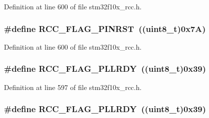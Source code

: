 Definition at line 600 of file stm32f10x\+\_\+rcc.\+h.

\subsubsection[{\texorpdfstring{R\+C\+C\+\_\+\+F\+L\+A\+G\+\_\+\+P\+I\+N\+R\+ST}{RCC_FLAG_PINRST}}]{\setlength{\rightskip}{0pt plus 5cm}\#define R\+C\+C\+\_\+\+F\+L\+A\+G\+\_\+\+P\+I\+N\+R\+ST~(({\bf uint8\+\_\+t})0x7\+A)}\hypertarget{group___r_c_c___flag_gabfc3ab5d4a8a94ec1c9f38794ce37ad6}{}\label{group___r_c_c___flag_gabfc3ab5d4a8a94ec1c9f38794ce37ad6}


Definition at line 600 of file stm32f10x\+\_\+rcc.\+h.

\subsubsection[{\texorpdfstring{R\+C\+C\+\_\+\+F\+L\+A\+G\+\_\+\+P\+L\+L\+R\+DY}{RCC_FLAG_PLLRDY}}]{\setlength{\rightskip}{0pt plus 5cm}\#define R\+C\+C\+\_\+\+F\+L\+A\+G\+\_\+\+P\+L\+L\+R\+DY~(({\bf uint8\+\_\+t})0x39)}\hypertarget{group___r_c_c___flag_gaf82d8afb18d9df75db1d6c08b9c50046}{}\label{group___r_c_c___flag_gaf82d8afb18d9df75db1d6c08b9c50046}


Definition at line 597 of file stm32f10x\+\_\+rcc.\+h.

\subsubsection[{\texorpdfstring{R\+C\+C\+\_\+\+F\+L\+A\+G\+\_\+\+P\+L\+L\+R\+DY}{RCC_FLAG_PLLRDY}}]{\setlength{\rightskip}{0pt plus 5cm}\#define R\+C\+C\+\_\+\+F\+L\+A\+G\+\_\+\+P\+L\+L\+R\+DY~(({\bf uint8\+\_\+t})0x39)}\hypertarget{group___r_c_c___flag_gaf82d8afb18d9df75db1d6c08b9c50046}{}\label{group___r_c_c___flag_gaf82d8afb18d9df75db1d6c08b9c50046}


